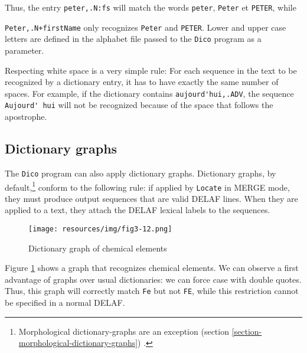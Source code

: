 \bigskip
\noindent Thus, the entry \verb$peter,.N:fs$ will match the words \verb+peter+,
\verb+Peter+ et \verb+PETER+, while

\noindent \verb$Peter,.N+firstName$ only 
recognizes \verb+Peter+ and \verb+PETER+. Lower and upper case
letters are defined in the alphabet file passed to the \verb+Dico+ program
as a parameter.

\bigskip
\noindent Respecting white space is a very simple rule: For each sequence in the text to be
recognized by a dictionary entry, it has to have exactly the same number of
spaces. For example, if the dictionary contains \verb+aujourd'hui,.ADV+, the
sequence \verb+Aujourd' hui+ will not be recognized because of the space that
follows the apostrophe.


\subsection{Dictionary graphs}
\label{section-dictionary-graphs}
The \verb+Dico+ program
can also apply dictionary graphs. Dictionary graphs,
by default,\footnote{Morphological dictionary-graphs are an exception (section
\ref{section-morphological-dictionary-graphs}) .}
conform to the following rule: if applied by \verb+Locate+ in MERGE mode,
they must produce output sequences that are valid DELAF lines.
When they are applied to a text, they attach the DELAF lexical labels to the sequences.

\begin{figure}[!p]
\begin{center}
\texttt{[image: resources/img/fig3-12.png]}
\caption{Dictionary graph of chemical elements\label{elements}}
\end{center}
\end{figure}

\bigskip
\noindent Figure \ref{elements} shows a graph that recognizes chemical
elements. We can observe a first advantage of graphs over usual dictionaries: we can force case
with double quotes. Thus, this graph will
correctly match \verb+Fe+ but not \verb+FE+, while this restriction cannot be specified in a
normal DELAF.

